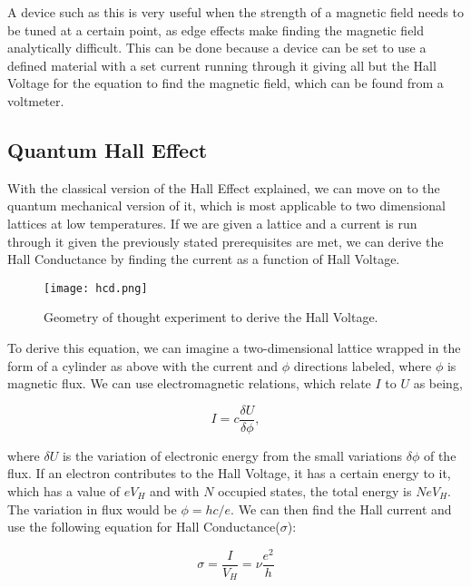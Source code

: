 \documentclass[14pt]{article}
\begin{document}
A device such as this is very useful when the strength of a magnetic field needs to be tuned at a certain point, as edge effects make finding the magnetic field analytically difficult. This can be done because a device can be set to use a defined material with a set current running through it giving all but the Hall Voltage for the equation to find the magnetic field, which can be found from a voltmeter\cite{qhe talk}.

\subsection*{Quantum Hall Effect}

With the classical version of the Hall Effect explained, we can move on to the quantum mechanical version of it, which is most applicable to two dimensional lattices at low temperatures. If we are given a lattice and a current is run through it given the previously stated prerequisites are met, we can derive the Hall Conductance by finding the current as a function of Hall Voltage.\\

\begin{figure}[ht]
	\centering
	\texttt{[image: hcd.png]}
	\label{fig:sheet6}
	\caption{Geometry of thought experiment to derive the Hall Voltage\cite{kittel}.}
\end{figure}

To derive this equation, we can imagine a two-dimensional lattice wrapped in the form of a cylinder as above with the current and $\phi$ directions labeled, where $\phi$ is magnetic flux. We can use electromagnetic relations, which relate $I$ to $U$ as being,

\begin{equation*}
I=c\frac{\delta U}{\delta \phi},
\end{equation*}

where $\delta U$ is the variation of electronic energy from the small variations $\delta \phi$ of the flux. If an electron contributes to the Hall Voltage, it has a certain energy to it, which has a value of $eV_H$ and with $N$ occupied states, the total energy is $NeV_H$. The variation in flux would be $\phi=hc/e$. We can then find the Hall current and use the following equation for Hall Conductance($\sigma$)\cite{kittel}:

\begin{equation}\label{eq:1}
\sigma = \frac{I}{V_H} = \nu\frac{e^2}{h}
\end{equation}
\end{document}
